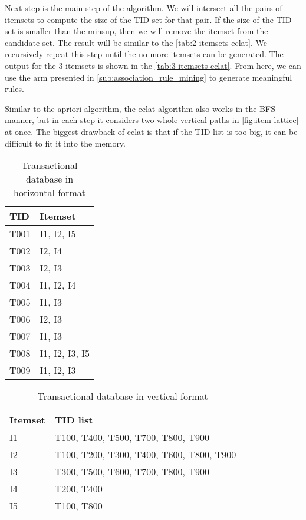 Next step is the main step of the algorithm. We will intersect all the pairs of itemsets to compute the size of the \ac{TID} set for that pair.
If the size of the \ac{TID} set is smaller than the \ac{minsup}, then we will remove the itemset from the candidate set.
The result will be similar to the \autoref{tab:2-itemsets-eclat}.
We recursively repeat this step until the no more itemsets can be generated.
The output for the 3-itemsets is shown in the \autoref{tab:3-itemsets-eclat}.
From here, we can use the \ac{arm} presented in \autoref{sub:association_rule_mining} to generate meaningful rules.

Similar to the \ac{apriori} algorithm, the \ac{eclat} algorithm also works in the \ac{BFS} manner, but in each step it considers two whole vertical paths in \autoref{fig:item-lattice} at once.
The biggest drawback of \acl{eclat} is that if the TID list is too big, it can be difficult to fit it into the memory.
\begin{table}[]
    \centering
    \begin{tabular}{|l|l|}
    \hline
    TID  & Itemset        \\ \hline
    T001 & I1, I2, I5     \\ \hline
    T002 & I2, I4         \\ \hline
    T003 & I2, I3         \\ \hline
    T004 & I1, I2, I4     \\ \hline
    T005 & I1, I3         \\ \hline
    T006 & I2, I3         \\ \hline
    T007 & I1, I3         \\ \hline
    T008 & I1, I2, I3, I5 \\ \hline
    T009 & I1, I2, I3     \\ \hline
    \end{tabular}
    \caption{Transactional database in horizontal format \citep{han2012mining}}
    \label{tab:horizontal-transactional-database}
\end{table}

\begin{table}[]
    \centering
    \begin{tabular}{|l|l|}
    \hline
    Itemset & TID list                                 \\ \hline
    I1      & T100, T400, T500, T700, T800, T900       \\ \hline
    I2      & T100, T200, T300, T400, T600, T800, T900 \\ \hline
    I3      & T300, T500, T600, T700, T800, T900       \\ \hline
    I4      & T200, T400                               \\ \hline
    I5      & T100, T800                               \\ \hline
    \end{tabular}
    \caption{Transactional database in vertical format \citep{han2012mining}}
    \label{tab:vertical-transactional-database}
\end{table}

